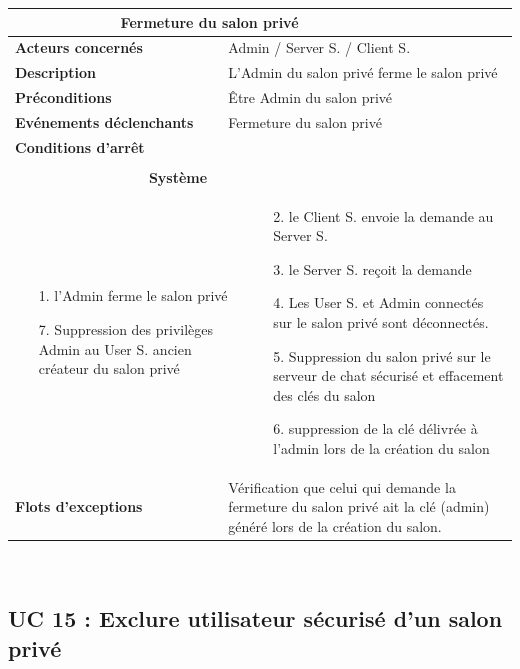 \documentclass[a4paper,11pt,french]{article}
\newcommand{\fiche}[9] {
	\noindent
\begin{tabular}{|p{3.5cm}| p{1cm} | p{3cm} | p{.5cm} | p{7cm}|} 
\hline
\rowcolor{blue}
\multicolumn{2}{|l|}{\color{white}\bfseries{Nom}} & \multicolumn{3}{l|}{\color{white}\bfseries{#1}}\\
\hline
\multicolumn{2}{|l|}{\bfseries{Acteurs concernés}} & \multicolumn{3}{m{10.5cm}|}{#2}\\
\hline
\multicolumn{2}{|l|}{\bfseries{Description}} & \multicolumn{3}{m{10.5cm}|}{#3}\\
\hline
\multicolumn{2}{|l|}{\bfseries{Préconditions}} & \multicolumn{3}{m{10.5cm}|}{#4}\\
\hline
\multicolumn{2}{|l|}{\bfseries{Evénements déclenchants}} & \multicolumn{3}{m{10.5cm}|}{#5}\\
\hline
\multicolumn{2}{|l|}{\bfseries{Conditions d'arrêt}} & \multicolumn{3}{m{10.5cm}|}{#6}\\
\hline
\rowcolor{gray}
\multicolumn{5}{|c|}{\bfseries{Description du flot d'événements principal}}\\
\hline
\rowcolor{gray}
\multicolumn{3}{|c|}{\bfseries{Acteur(s)}} & \multicolumn{2}{c|}{\bfseries{Système}}\\
\hline
\multicolumn{3}{|p{7.5cm}|}{#7} & \multicolumn{2}{p{7.5cm}|}{#8}\\
\hline
\multicolumn{2}{|l}{\bfseries{Flots d'exceptions}} & \multicolumn{3}{|p{11.5cm}|}{#9}\\
\hline
\end{tabular}
\\
}
\begin{document}
\fiche
	{Fermeture du salon privé} %
	{Admin / Server S. / Client S.} %
	{L’Admin du salon privé ferme le salon privé} %
	{Être Admin du salon privé} %
	{Fermeture du salon privé} %
	{} %
	{\begin{itemize}  %
		\item [1.] l’Admin ferme le salon privé
		\item[] 
		\item[] 
		\item[] 
		\item[] 
		\item [7.] Suppression des privilèges Admin au User S. ancien créateur du salon privé
	 \end{itemize}
	} 
	{\begin{itemize}  %
		\item []
		\item [2.] le Client S. envoie la demande au Server S.
		\item [3.] le Server S. reçoit la demande
		\item [4.] Les User S. et Admin connectés sur le salon privé sont déconnectés.
		\item [5.] Suppression du salon privé sur le serveur de chat sécurisé et effacement des clés du salon
		\item [6.] suppression de la clé délivrée à l’admin lors de la création du salon 
	 \end{itemize}
	 }
	{Vérification que celui qui demande la fermeture du salon privé ait la clé (admin) généré lors de la création du salon. } %

\subsection{UC 15 : Exclure utilisateur sécurisé d’un salon privé}
\end{document}
